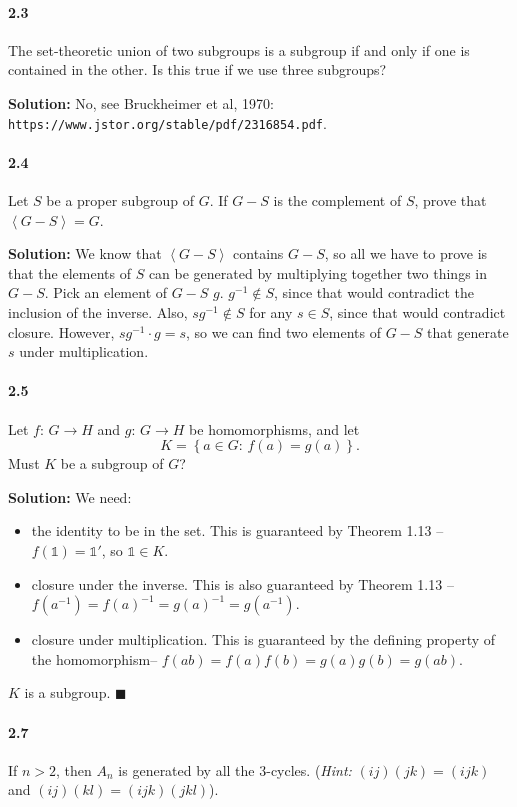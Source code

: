 \documentclass[12pt,a4paper]{article}
\providecommand{\id}{\mathbb{1}}
\providecommand{\hint}{\emph{Hint: }}
\providecommand{\soln}{\textbf{Solution: }}
\providecommand{\set}[1]{\left \lbrace #1 \right \rbrace}
\renewcommand{\iff}{\textrm{if and only if}\xspace}
\providecommand{\inv}{^{-1}}
\providecommand{\gen}[1]{\left \langle #1 \right \rangle}
\providecommand{\hism}{homomorphism\xspace}
\begin{document}
\paragraph*{2.3}
The set-theoretic union of two subgroups is a subgroup \iff one is contained in the other. 
Is this true if we use three subgroups?

\soln No, see Bruckheimer et al, 1970: \texttt{https://www.jstor.org/stable/pdf/2316854.pdf}.

\paragraph*{2.4}
Let $S$ be a proper subgroup of $G$. 
If $G - S$ is the complement of $S$, prove that $\gen{G - S} = G$.

\soln We know that $\gen{G - S}$ contains $G - S$, so all we have to prove is that the elements of $S$ can be generated by multiplying together two things in $G - S$.
Pick an element of $G - S$ $g$. 
$g^{-1} \notin S$, since that would contradict the inclusion of the inverse. 
Also, $sg^{-1} \notin S$ for any $s \in S$, since that would contradict closure.  
However, $sg^{-1} \cdot g = s$, so we can find two elements of $G - S$ that generate $s$ under multiplication. 

\paragraph*{2.5}
Let $f: \, G \rightarrow H$ and $g: \, G \rightarrow H$ be \hism{s}, and let
\begin{equation*}
K = \set{a \in G: \, f(a) = g(a)}.
\end{equation*}
Must $K$ be a subgroup of $G$?

\soln We need: 
\begin{itemize}
	\item the identity to be in the set.
	This is guaranteed by Theorem 1.13 -- $f(\id) = \id'$, so $\id \in K$.
	\item closure under the inverse. 
	This is also guaranteed by Theorem 1.13 -- $f(a\inv) = f(a)\inv = g(a)\inv = g(a\inv)$.
	\item closure under multiplication. 
	This is guaranteed by the defining property of the \hism -- $f(a b) = f(a) f(b) = g(a) g(b) = g(a b)$. 
\end{itemize}
$K$ is a subgroup. $\blacksquare$

\paragraph*{2.7}
If $n > 2$, then $A_n$ is generated by all the $3$-cycles. (\hint $(ij)(jk)=(ijk)$ and $(ij)(kl)=(ijk)(jkl)$).
\end{document}
